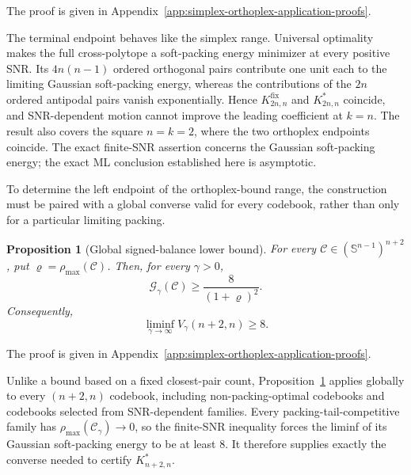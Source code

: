 \documentclass[12pt,draftclsnofoot,onecolumn]{IEEEtran}
\newcommand{\Sph}{\mathbb{S}}
\newcommand{\cC}{\mathcal{C}}
\newcommand{\cG}{\mathcal{G}}
\newtheorem{proposition}{Proposition}
\theoremstyle{definition}
\begin{document}
\begin{IEEEproof}
The proof is given in
Appendix~\ref{app:simplex-orthoplex-application-proofs}.
\end{IEEEproof} 

The terminal endpoint behaves like the simplex range.  Universal
optimality makes the full cross-polytope a soft-packing energy minimizer at
every positive SNR.  Its \(4n(n-1)\) ordered orthogonal pairs contribute
one unit each to the limiting Gaussian soft-packing energy, whereas the
contributions of the \(2n\) ordered antipodal pairs vanish exponentially.
Hence
\(K^{\mathrm{fix}}_{2n,n}\) and \(K^{\ast}_{2n,n}\) coincide, and SNR-dependent motion cannot improve the
leading coefficient at \(k=n\).  The result also covers the square \(n=k=2\),
where the two orthoplex endpoints coincide.  The exact finite-SNR
assertion concerns the Gaussian soft-packing energy; the exact ML conclusion established
here is asymptotic.

To determine the left endpoint of the orthoplex-bound range, the construction must be paired with a
global converse valid for every codebook, rather than only for a
particular limiting packing.

\begin{proposition}[Global signed-balance lower bound]
\label{prop:orthoplex-left-endpoint-soft-energy-lower-bound}
For every \(\cC\in(\Sph^{n-1})^{n+2}\), put
\(\varrho=\rho_{\max}(\cC)\).  Then, for every \(\gamma>0\),
\begin{equation}
  \cG_\gamma(\cC)
  \ge
  \frac{8}{(1+\varrho)^2}.
  \label{eq:orthoplex-left-endpoint-finite-energy-lower-bound}
\end{equation}
Consequently,
\begin{equation}
  \liminf_{\gamma\to\infty}V_\gamma(n+2,n)\ge8.
  \label{eq:orthoplex-left-endpoint-liminf}
\end{equation}
\end{proposition}
\begin{IEEEproof}
The proof is given in
Appendix~\ref{app:simplex-orthoplex-application-proofs}.
\end{IEEEproof} 


Unlike a bound based on a fixed closest-pair count,
Proposition~\ref{prop:orthoplex-left-endpoint-soft-energy-lower-bound}
applies globally to every \((n+2,n)\) codebook, including non-packing-optimal codebooks
and codebooks selected from SNR-dependent families.  Every
packing-tail-competitive family has
\(\rho_{\max}(\cC_\gamma)\to0\), so the finite-SNR inequality forces
the liminf of its Gaussian soft-packing energy to be at least \(8\).  It therefore supplies exactly
the converse needed to certify \(K^{\ast}_{n+2,n}\).
\end{document}
